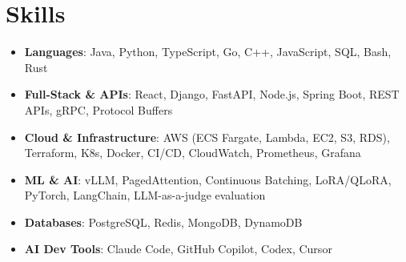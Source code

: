 \documentclass[letterpaper,11pt]{article}
\newcommand{\resumeSubHeadingListStart}{\begin{itemize}[leftmargin=0.15in, label={}]}
\newcommand{\resumeSubHeadingListEnd}{\end{itemize}}
\newcommand{\resumeSkillHeading}[2]{%
  \item\small{\textbf{#1}: #2 \vspace{-9pt}}%
}
\begin{document}
\section{Skills}
  \resumeSubHeadingListStart
    \resumeSkillHeading{Languages}{Java, Python, TypeScript, Go, C++, JavaScript, SQL, Bash, Rust}
    \resumeSkillHeading{Full-Stack \& APIs}{React, Django, FastAPI, Node.js, Spring Boot, REST APIs, gRPC, Protocol Buffers}
    \resumeSkillHeading{Cloud \& Infrastructure}{AWS (ECS Fargate, Lambda, EC2, S3, RDS), Terraform, K8s, Docker, CI/CD, CloudWatch, Prometheus, Grafana}
    \resumeSkillHeading{ML \& AI}{vLLM, PagedAttention, Continuous Batching, LoRA/QLoRA, PyTorch, LangChain, LLM-as-a-judge evaluation}
    \resumeSkillHeading{Databases}{PostgreSQL, Redis, MongoDB, DynamoDB}
    \resumeSkillHeading{AI Dev Tools}{Claude Code, GitHub Copilot, Codex, Cursor}
  \resumeSubHeadingListEnd
\end{document}
